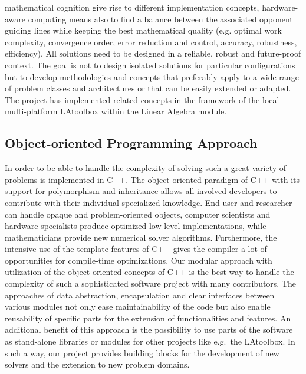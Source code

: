 mathematical cognition give rise to different implementation concepts,
hardware-aware computing means also to find a balance between the
associated opponent guiding lines while keeping the best mathematical
quality (e.g. optimal work complexity, convergence order, error
reduction and control, accuracy, robustness, efficiency). All
solutions need to be designed in a reliable, robust and future-proof
context. The goal is not to design isolated solutions for particular
configurations but to develop methodologies and concepts that
preferably apply to a wide range of problem classes and architectures
or that can be easily extended or adapted. The \hiflow{} project has
implemented related concepts in the framework of the local
multi-platform LAtoolbox \cite{HLW2010,HSLW2010} within the Linear 
Algebra module.

\subsection{Object-oriented Programming Approach}
In order to be able to handle the complexity of
solving such a great variety of problems \hiflow{} is implemented in
C++. The object-oriented paradigm of C++ with its support for
polymorphism and inheritance allows all involved developers to
contribute with their individual specialized knowledge. End-user and
researcher can handle opaque and problem-oriented objects, computer
scientists and hardware specialists produce optimized low-level
implementations, while mathematicians provide new numerical solver
algorithms. Furthermore, the intensive use of the template features of
C++ gives the compiler a lot of opportunities for compile-time
optimizations. Our modular approach with utilization of the
object-oriented concepts of C++ is the best way to handle the
complexity of such a sophisticated software project with many
contributors. The approaches of data abstraction, encapsulation and
clear interfaces between various modules not only ease maintainability
of the code but also enable reusability of specific parts for the
extension of functionalities and features. An additional benefit of
this approach is the possibility to use parts of the software as
stand-alone libraries or modules for other projects like e.g.~the
LAtoolbox. In such a way, our project provides building blocks for the
development of new solvers and the extension to new problem domains.

